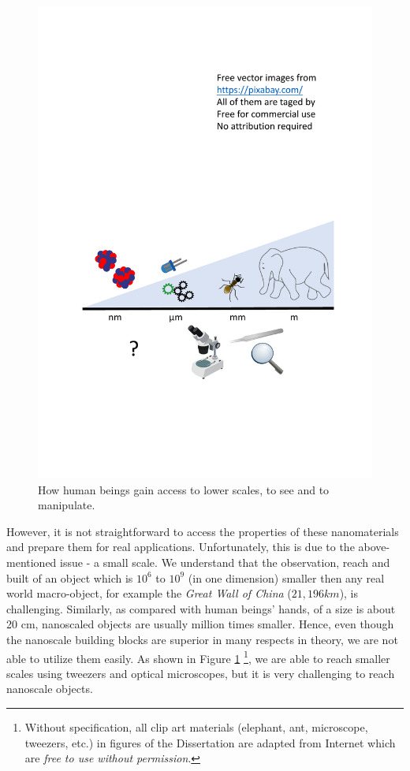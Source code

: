 \begin{figure} 
\centering
\includegraphics[width=\textwidth]{figures/figure1_scale_problem.pdf}
\caption[Scale problem]{How human beings gain access to lower scales, to see and to manipulate.\footnotemark[1]
\label{fig:1_scale}}
\end{figure}

However, it is not straightforward to access the properties of these nanomaterials and prepare them for real applications. Unfortunately, this is due to the above-mentioned issue - a small scale. We understand that the observation, reach and built of an object which is $10^6$ to $10^9$ (in one dimension) smaller then any real world macro-object, for example the {\em Great Wall of China} ($21,196 km$), is challenging. Similarly, as compared with human beings' hands, of a size is about 20 cm, nanoscaled objects are usually million times smaller. Hence, even though the nanoscale building blocks are superior in many respects in theory, we are not able to utilize them easily. As shown in Figure \ref{fig:1_scale} \footnote{Without specification, all clip art materials (elephant, ant, microscope, tweezers, etc.) in figures of the Dissertation are adapted from Internet which are {\em free to use without permission}.}, we are able to reach smaller scales using tweezers and optical microscopes, but it is very challenging to reach nanoscale objects. \\

